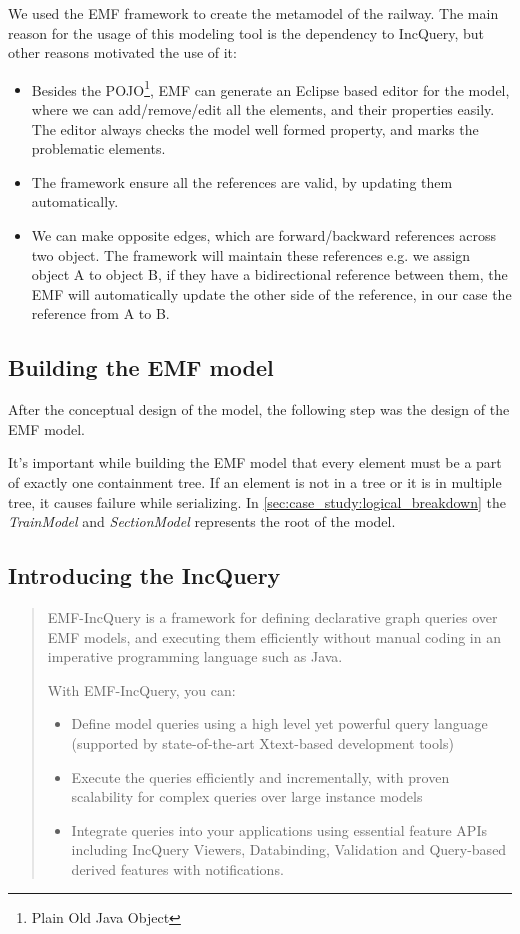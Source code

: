 We used the EMF framework to create the metamodel of the railway. The main reason for the usage of this modeling tool is the dependency to IncQuery, but other reasons motivated the use of it:
\begin{itemize}
	\item Besides the POJO\footnote{Plain Old Java Object}, EMF can generate an Eclipse based editor for the model, where we can add/remove/edit all the elements, and their properties easily. The editor always checks the model well formed property, and marks the problematic elements.
	\item The framework ensure all the references are valid, by updating them automatically.
	\item We can make opposite edges, which are forward/backward references across two object. The framework will maintain these references e.g. we assign object A to object B, if they have a bidirectional reference between them, the EMF will automatically update the other side of the reference, in our case the reference from A to B.
\end{itemize}

\subsection{Building the EMF model}

After the conceptual design of the model, the following step was the design of the EMF model.

It's important while building the EMF model that every element must be a part of exactly one containment tree. If an element is not in a tree or it is in multiple tree, it causes failure while serializing. In \cref{sec:case_study:logical_breakdown} the \emph{TrainModel} and \emph{SectionModel} represents the root of the model.

\begin{samepage}
\subsection{Introducing the IncQuery}
\begin{quotation}
EMF-IncQuery is a framework for defining declarative graph queries over EMF models, and executing them efficiently without manual coding in an imperative programming language such as Java.

With EMF-IncQuery, you can:
\begin{itemize}
	\item Define model queries using a high level yet powerful query language (supported by state-of-the-art Xtext-based development tools)
	\item Execute the queries efficiently and incrementally, with proven scalability for complex queries over large instance models
	\item Integrate queries into your applications using essential feature APIs including IncQuery Viewers, Databinding, Validation and Query-based derived features with notifications.
\end{itemize}
\end{quotation}
\end{samepage}

